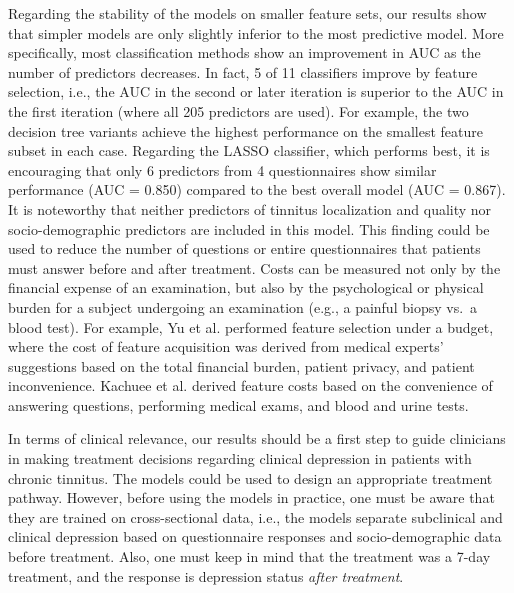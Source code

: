 \documentclass[
  oneside]{book}
\begin{document}
Regarding the stability of the models on smaller feature sets, our results show that simpler models are only slightly inferior to the most predictive model.
More specifically, most classification methods show an improvement in AUC as the number of predictors decreases.
In fact, 5 of 11 classifiers improve by feature selection, i.e., the AUC in the second or later iteration is superior to the AUC in the first iteration (where all 205 predictors are used).
For example, the two decision tree variants achieve the highest performance on the smallest feature subset in each case.
Regarding the LASSO classifier, which performs best, it is encouraging that only 6 predictors from 4 questionnaires show similar performance (AUC = 0.850) compared to the best overall model (AUC = 0.867).
It is noteworthy that neither predictors of tinnitus localization and quality nor socio-demographic predictors are included in this model.
This finding could be used to reduce the number of questions or entire questionnaires that patients must answer before and after treatment.
Costs can be measured not only by the financial expense of an examination, but also by the psychological or physical burden for a subject undergoing an examination (e.g., a painful biopsy vs.~a blood test).
For example, Yu et al. \autocite{yu2020controlling} performed feature selection under a budget, where the cost of feature acquisition was derived from medical experts' suggestions based on the total financial burden, patient privacy, and patient inconvenience.
Kachuee et al. \autocite{kachuee2019costsensitive} derived feature costs based on the convenience of answering questions, performing medical exams, and blood and urine tests.

In terms of clinical relevance, our results should be a first step to guide clinicians in making treatment decisions regarding clinical depression in patients with chronic tinnitus.
The models could be used to design an appropriate treatment pathway.
However, before using the models in practice, one must be aware that they are trained on cross-sectional data, i.e., the models separate subclinical and clinical depression based on questionnaire responses and socio-demographic data before treatment.
Also, one must keep in mind that the treatment was a 7-day treatment, and the response is depression status \emph{after treatment}.
\end{document}
